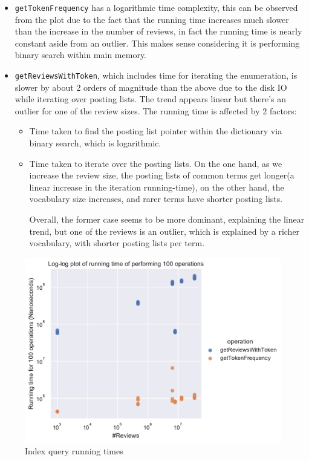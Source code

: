\documentclass[11pt]{article}
\begin{document}
\begin{itemize}
	\item \texttt{getTokenFrequency} has a logarithmic time complexity, this can be observed from the plot due to the fact that the running time increases much slower than the increase
	in the number of reviews, in fact the running time is nearly constant aside from an outlier. This makes sense considering it is performing binary search within main memory.
	
	\item \texttt{getReviewsWithToken}, which includes time for iterating the enumeration, is slower by about 2 orders of magnitude than the above due to the disk IO while iterating over posting lists. The trend appears linear but there's an outlier for one of the review sizes. The running time is affected by 2 factors:
	\begin{itemize}
		\item Time taken to find the posting list pointer within
		the dictionary via binary search, which is logarithmic.
		\item Time taken to iterate over the posting lists. On the one hand, as we increase the review size, the posting lists of common terms get longer(a linear increase in the iteration running-time), on the other hand, the vocabulary size increases, and rarer terms have shorter posting lists.
		
		Overall, the former case seems to be more dominant, explaining the linear trend, but one of the reviews is an outlier, which is explained by a richer vocabulary, with shorter posting lists per term.
	\end{itemize}
\end{itemize}



\begin{figure}[!htb]
	\caption{Index query running times}
	\label{fig:ops}
	\centering
	\includegraphics[width=\textwidth,height=\textheight,keepaspectratio]{ops.pdf}
\end{figure}
\end{document}
